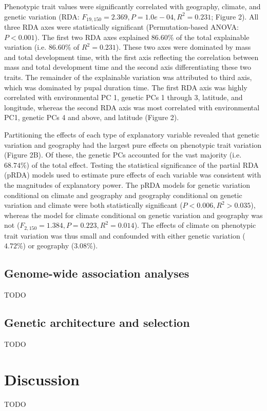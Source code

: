 \documentclass[smallextended]{svjour3}
\begin{document}
Phenotypic trait values were significantly correlated with geography, climate, and genetic
variation (RDA: $F_{19,150} = 2.369, P = 1.0e-04, R^2 = 0.231$; Figure 2). All three RDA
axes were statistically significant (Permutation-based ANOVA: $P < 0.001$).
The first two RDA axes explained $86.60\%$ of the total explainable variation (i.e. $86.60\%$ of $R^2 = 0.231$).
These two axes were dominated by mass and total development time, with the first axis reflecting
the correlation between mass and total development time and the second axis differentiating these two traits. The
remainder of the explainable variation was attributed to third axis, which was dominated by pupal duration time. 
The first RDA axis was highly correlated with environmental PC 1, genetic PCs 1 through 3, 
latitude, and longitude, whereas the second RDA axis was most correlated with environmental PC1,
genetic PCs 4 and above, and latitude (Figure 2). 

Partitioning the effects of each type of explanatory variable revealed that genetic
variation and geography had the largest pure effects on phenotypic trait variation (Figure 2B). 
Of these, the genetic PCs accounted for the vast majority (i.e. $68.74\%$) of the total effect. 
Testing the statistical significance of the partial 
RDA (pRDA) models used to estimate pure effects of each variable was consistent with the magnitudes of explanatory power. 
The pRDA models for genetic variation conditional on climate and geography and geography conditional on genetic
variation and climate were both statistically significant ($P < 0.006, R^2 > 0.035$), 
whereas the model for climate conditional on genetic variation and geography 
was not ($F_{2,150} = 1.384, P = 0.223, R^2 = 0.014$). The effects of climate on phenotypic 
trait variation was thus small and confounded with either genetic variation ($4.72\%$) or geography ($3.08\%$).


\subsection*{Genome-wide association analyses}
TODO

\subsection*{Genetic architecture and selection}
TODO

\section*{Discussion}
TODO
\end{document}
